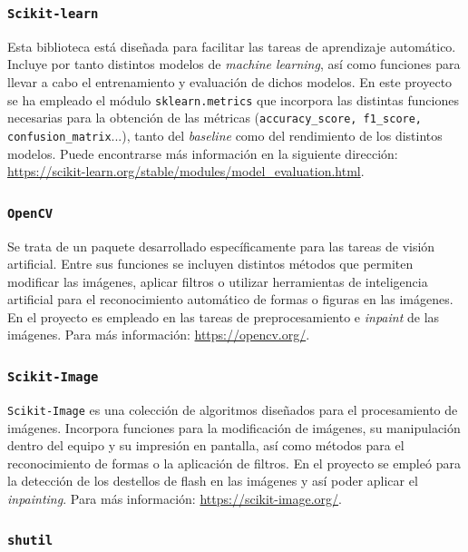 \subsubsection{\texttt{Scikit-learn}}

Esta biblioteca está diseñada para facilitar las tareas de aprendizaje automático. Incluye por tanto distintos modelos de \textit{machine learning}, así como funciones para llevar a cabo el entrenamiento y evaluación de dichos modelos. En este proyecto se ha empleado el módulo \texttt{sklearn.metrics} que incorpora las distintas funciones necesarias para la obtención de las métricas (\texttt{accuracy\_score, f1\_score, confusion\_matrix}...), tanto del \textit{baseline} como del rendimiento de los distintos modelos. Puede encontrarse más información en la siguiente dirección: \url{https://scikit-learn.org/stable/modules/model_evaluation.html}.

\subsubsection{\texttt{OpenCV}}

Se trata de un paquete desarrollado específicamente para las tareas de visión artificial. Entre sus funciones se incluyen distintos métodos que permiten modificar las imágenes, aplicar filtros o utilizar herramientas de inteligencia artificial para el reconocimiento automático de formas o figuras en las imágenes. En el proyecto es empleado en las tareas de preprocesamiento e \textit{inpaint} de las imágenes. Para más información: \url{https://opencv.org/}.

\subsubsection{\texttt{Scikit-Image}}

\texttt{Scikit-Image} es una colección de algoritmos diseñados para el procesamiento de imágenes. Incorpora funciones para la modificación de imágenes, su manipulación dentro del equipo y su impresión en pantalla, así como métodos para el reconocimiento de formas o la aplicación de filtros. En el proyecto se empleó para la detección de los destellos de flash en las imágenes y así poder aplicar el \textit{inpainting}. Para más información: \url{https://scikit-image.org/}.

\subsubsection{\texttt{shutil}}

